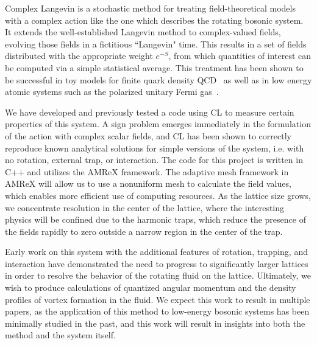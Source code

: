 \documentclass[onecolumn, 12pt]{article}
\newcommand{\beq}{\begin{equation}}
\newcommand{\eeq}{\end{equation}}
\def\CZ{{\mathcal Z}}
\def\del{{\nabla}}
\newcommand*\dif{\mathop{}\!\mathrm{d}}
\begin{document}
%
%
%
%

Complex Langevin is a stochastic method for treating field-theoretical models with a complex action like the one which describes the rotating bosonic system. It extends the well-established Langevin method to complex-valued fields, evolving those fields in a fictitious ``Langevin" time. This results in a set of fields distributed with the appropriate weight $e^{-S}$, from which quantities of interest can be computed via a simple statistical average. This treatment has been shown to be successful in toy models for finite quark density QCD~\cite{BergerCLReview} as well as in low energy atomic systems such as the polarized unitary Fermi gas~\cite{BergerCLReview}. 

We have developed and previously tested a code using CL to measure certain properties of this system. A sign problem emerges immediately in the formulation of the action with complex scalar fields, and CL has been shown to correctly reproduce known analytical solutions for simple versions of the system, i.e. with no rotation, external trap, or interaction. The code for this project is written in C++ and utilizes the AMReX framework. The adaptive mesh framework in AMReX will allow us to use a nonuniform mesh to calculate the field values, which enables more efficient use of computing resources. As the lattice size grows, we concentrate resolution in the center of the lattice, where the interesting physics will be confined due to the harmonic traps, which reduce the presence of the fields rapidly to zero outside a narrow region in the center of the trap.

Early work on this system with the additional features of rotation, trapping, and interaction have demonstrated the need to progress to significantly larger lattices in order to resolve the behavior of the rotating fluid on the lattice. Ultimately, we wish to produce calculations of quantized angular momentum and the density profiles of vortex formation in the fluid.
We expect this work to result in multiple papers, as the application of this method to low-energy bosonic systems has been minimally studied in the past, and this work will result in insights into both the method and the system itself.
\end{document}
